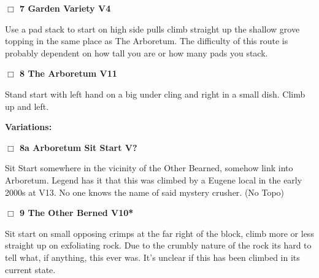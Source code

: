 	\begin{multicols}{2}

\needspace{2em}
\label{rt:Garden Variety}
\colorbox{RoyalBlue!20}{
\parbox{0.95\linewidth}{
\hspace{-1ex}\textbf{$\Box$
7 Garden Variety V4  
}}}
\begin{adjustwidth}{1.3em}{}			

Use a pad stack to start on high side pulls climb straight up the shallow grove topping in the same place as The Arboretum. The difficulty of this route is probably dependent on how tall you are or how many pads you stack.
\end{adjustwidth}




\needspace{2em}
\label{rt:The Arboretum}
\colorbox{red!20}{
\parbox{0.95\linewidth}{
\hspace{-1ex}\textbf{$\Box$
8 The Arboretum V11  
}}}
\begin{adjustwidth}{1.3em}{}			

Stand start with left hand on a big under cling and right in a small dish. Climb up and left.
\end{adjustwidth}


\begin{adjustwidth}{0.5cm}{}				
\needspace{4em}
\textbf{Variations:} \newline

\needspace{2em}
\label{vr:Arboretum Sit Start}
\colorbox{black!20}{
\parbox{0.95\linewidth}{
\hspace{-1ex}\textbf{$\Box$
8a Arboretum Sit Start V?  
}}}
\begin{adjustwidth}{1.3em}{}			

Sit Start somewhere in the vicinity of the Other Bearned, somehow link into Arboretum. Legend has it that this was climbed by a Eugene local in the early 2000s at V13. No one knows the name of said mystery crusher.
  (No Topo)
\end{adjustwidth}



\end{adjustwidth}


\needspace{2em}
\label{rt:The Other Berned}
\colorbox{red!20}{
\parbox{0.95\linewidth}{
\hspace{-1ex}\textbf{$\Box$
9 The Other Berned V10*  
}}}
\begin{adjustwidth}{1.3em}{}			

Sit start on small opposing crimps at the far right of the block, climb more or less straight up on exfoliating rock. Due to the crumbly nature of the rock its hard to tell what, if anything, this ever was. It's unclear if this has been climbed in its current state.
\end{adjustwidth}




	\end{multicols}
